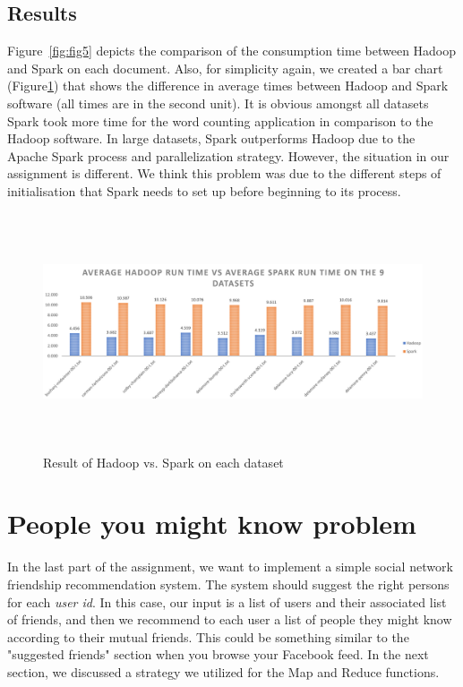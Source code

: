 \documentclass[12pt]{article}
\begin{document}
\newpage

\subsection{Results}
\noindent Figure~\ref{fig:fig5} depicts the comparison of the consumption time between Hadoop and Spark on each document. Also, for simplicity again, we created a bar chart (Figure\ref{fig:fig6}) that shows the difference in average times between Hadoop and Spark software (all times are in the second unit). It is obvious amongst all datasets Spark took more time for the word counting application in comparison to the Hadoop software. In large datasets, Spark outperforms Hadoop due to the Apache Spark process and parallelization strategy. However, the situation in our assignment is different. We think this problem was due to the different steps of initialisation that Spark needs to set up before beginning to its process.

\begin{figure}[h]
    \centering
    \includegraphics[width=140mm, height=70mm, scale=1.0]{images/Hadoop_vs_Spark_graph.PNG}
    \caption{Result of Hadoop vs. Spark on each dataset}
    \label{fig:fig6}
\end{figure}

\newpage

\section{People you might know problem}

In the last part of the assignment, we want to implement a simple social network friendship recommendation system. The system should suggest the right persons for each \textit{user id}. In this case, our input is a list of users and their associated list of friends, and then we recommend to each user a list of people they might know according to their mutual friends. This could be something similar to the "suggested friends" section when you browse your Facebook feed. In the next section, we discussed a strategy we utilized for the Map and Reduce functions. 
\end{document}
